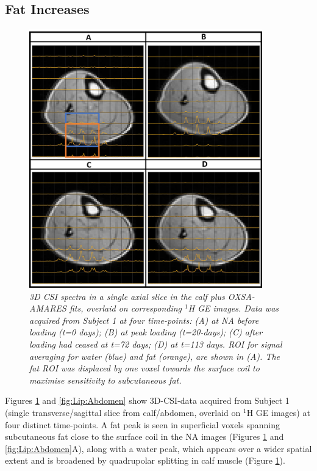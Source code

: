 \documentclass[class=article, crop=false]{standalone}
\begin{document}
\subsection{Fat Increases}

\begin{figure}
    \centering
    \includegraphics[width=0.9\textwidth]{Figures/Lipid/Calf.png}
    \caption{\textit{3D CSI spectra in a single axial slice in the calf plus OXSA-AMARES fits, overlaid on corresponding $^1$H GE images. Data was acquired from Subject 1 at four time-points: (A) at NA before loading (t=0 days); (B) at peak loading (t=20-days); (C) after loading had ceased at t=72 days; (D) at t=113 days. ROI for signal averaging for water (blue) and fat (orange), are shown in (A). The fat ROI was displaced by one voxel towards the surface coil to maximise sensitivity to subcutaneous fat.}}
    \label{fig:Lip:Calf}
\end{figure}

Figures \ref{fig:Lip:Calf} and \ref{fig:Lip:Abdomen} show 3D-CSI-data acquired from Subject 1 (single transverse/sagittal slice from calf/abdomen, overlaid on $^1$H GE images) at four distinct time-points. A fat peak is seen in superficial voxels spanning subcutaneous fat close to the surface coil in the NA images (Figures \ref{fig:Lip:Calf} and \ref{fig:Lip:Abdomen}A), along with a water peak, which appears over a wider spatial extent and is broadened by quadrupolar splitting in calf muscle (Figure \ref{fig:Lip:Calf}). 
\end{document}
